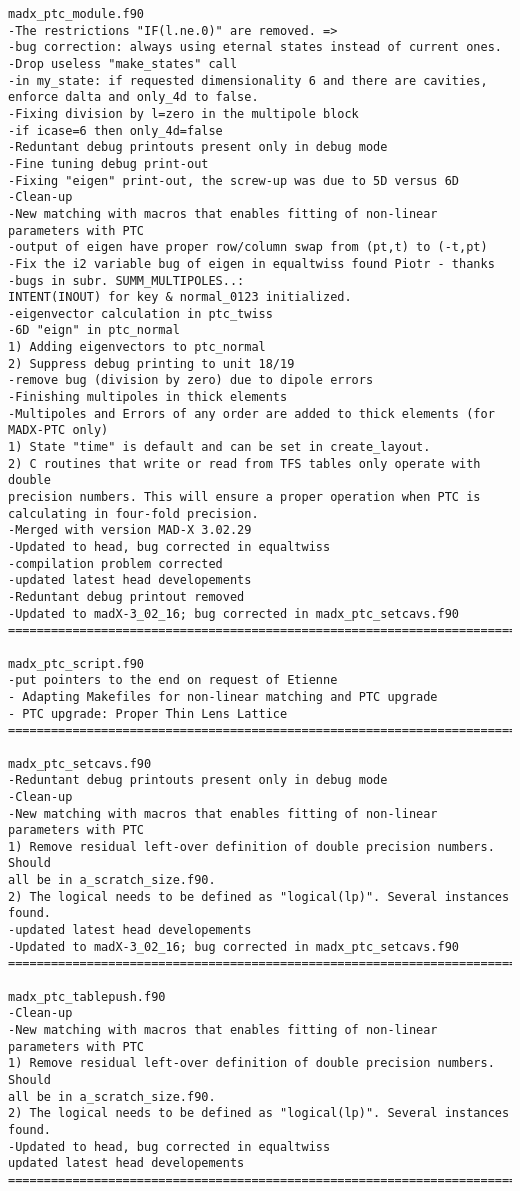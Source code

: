 \begin{verbatim}
madx_ptc_module.f90
-The restrictions "IF(l.ne.0)" are removed. =>
-bug correction: always using eternal states instead of current ones.
-Drop useless "make_states" call
-in my_state: if requested dimensionality 6 and there are cavities, enforce dalta and only_4d to false.
-Fixing division by l=zero in the multipole block
-if icase=6 then only_4d=false
-Reduntant debug printouts present only in debug mode
-Fine tuning debug print-out
-Fixing "eigen" print-out, the screw-up was due to 5D versus 6D
-Clean-up
-New matching with macros that enables fitting of non-linear parameters with PTC
-output of eigen have proper row/column swap from (pt,t) to (-t,pt)
-Fix the i2 variable bug of eigen in equaltwiss found Piotr - thanks
-bugs in subr. SUMM_MULTIPOLES..:
INTENT(INOUT) for key & normal_0123 initialized.
-eigenvector calculation in ptc_twiss
-6D "eign" in ptc_normal
1) Adding eigenvectors to ptc_normal
2) Suppress debug printing to unit 18/19
-remove bug (division by zero) due to dipole errors
-Finishing multipoles in thick elements
-Multipoles and Errors of any order are added to thick elements (for MADX-PTC only)
1) State "time" is default and can be set in create_layout.
2) C routines that write or read from TFS tables only operate with double
precision numbers. This will ensure a proper operation when PTC is
calculating in four-fold precision.
-Merged with version MAD-X 3.02.29
-Updated to head, bug corrected in equaltwiss
-compilation problem corrected
-updated latest head developements
-Reduntant debug printout removed
-Updated to madX-3_02_16; bug corrected in madx_ptc_setcavs.f90
=============================================================================

madx_ptc_script.f90
-put pointers to the end on request of Etienne
- Adapting Makefiles for non-linear matching and PTC upgrade
- PTC upgrade: Proper Thin Lens Lattice
=============================================================================

madx_ptc_setcavs.f90
-Reduntant debug printouts present only in debug mode
-Clean-up
-New matching with macros that enables fitting of non-linear parameters with PTC
1) Remove residual left-over definition of double precision numbers. Should
all be in a_scratch_size.f90.
2) The logical needs to be defined as "logical(lp)". Several instances found.
-updated latest head developements
-Updated to madX-3_02_16; bug corrected in madx_ptc_setcavs.f90
=============================================================================

madx_ptc_tablepush.f90
-Clean-up
-New matching with macros that enables fitting of non-linear parameters with PTC
1) Remove residual left-over definition of double precision numbers. Should
all be in a_scratch_size.f90.
2) The logical needs to be defined as "logical(lp)". Several instances found.
-Updated to head, bug corrected in equaltwiss
updated latest head developements
=============================================================================


\end{verbatim}

